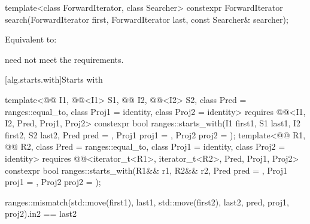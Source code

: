 %
\begin{itemdecl}
template<class ForwardIterator, class Searcher>
  constexpr ForwardIterator
    search(ForwardIterator first, ForwardIterator last, const Searcher& searcher);
\end{itemdecl}

\begin{itemdescr}
\pnum
\effects
Equivalent to: 

\pnum
\remarks
{} need not meet the  requirements.
\end{itemdescr}

[alg.starts.with]{Starts with}

%
\begin{itemdecl}
template<@@ I1, @@<I1> S1, @@ I2, @@<I2> S2,
         class Pred = ranges::equal_to, class Proj1 = identity, class Proj2 = identity>
  requires @@<I1, I2, Pred, Proj1, Proj2>
  constexpr bool ranges::starts_with(I1 first1, S1 last1, I2 first2, S2 last2, Pred pred = {},
                                     Proj1 proj1 = {}, Proj2 proj2 = {});
template<@@ R1, @@ R2, class Pred = ranges::equal_to, class Proj1 = identity,
         class Proj2 = identity>
  requires @@<iterator_t<R1>, iterator_t<R2>, Pred, Proj1, Proj2>
  constexpr bool ranges::starts_with(R1&& r1, R2&& r2, Pred pred = {},
                                     Proj1 proj1 = {}, Proj2 proj2 = {});
\end{itemdecl}

\begin{itemdescr}
\pnum
\returns
\begin{codeblock}
ranges::mismatch(std::move(first1), last1, std::move(first2), last2,
                 pred, proj1, proj2).in2 == last2
\end{codeblock}
\end{itemdescr}

